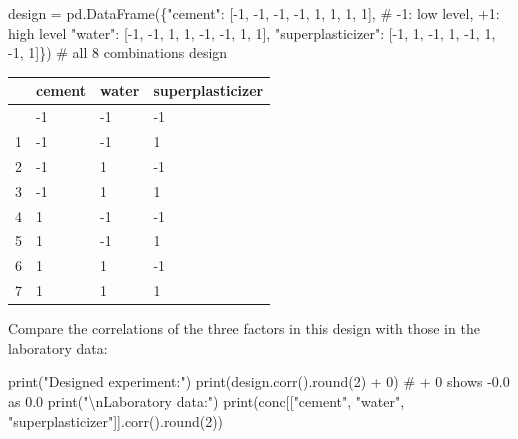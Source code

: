 \documentclass[
  letterpaper,
  DIV=11,
  numbers=noendperiod]{scrreprt}
\newenvironment{Shaded}{\begin{snugshade}}{\end{snugshade}}
\newcommand{\BuiltInTok}[1]{\textcolor[rgb]{0.00,0.23,0.31}{#1}}
\newcommand{\CharTok}[1]{\textcolor[rgb]{0.13,0.47,0.30}{#1}}
\newcommand{\CommentTok}[1]{\textcolor[rgb]{0.37,0.37,0.37}{#1}}
\newcommand{\DecValTok}[1]{\textcolor[rgb]{0.68,0.00,0.00}{#1}}
\newcommand{\NormalTok}[1]{\textcolor[rgb]{0.00,0.23,0.31}{#1}}
\newcommand{\OperatorTok}[1]{\textcolor[rgb]{0.37,0.37,0.37}{#1}}
\newcommand{\StringTok}[1]{\textcolor[rgb]{0.13,0.47,0.30}{#1}}
\begin{document}
\begin{Shaded}
\begin{Highlighting}[]
\NormalTok{design }\OperatorTok{=}\NormalTok{ pd.DataFrame(\{}\StringTok{"cement"}\NormalTok{:           [}\OperatorTok{{-}}\DecValTok{1}\NormalTok{, }\OperatorTok{{-}}\DecValTok{1}\NormalTok{, }\OperatorTok{{-}}\DecValTok{1}\NormalTok{, }\OperatorTok{{-}}\DecValTok{1}\NormalTok{,  }\DecValTok{1}\NormalTok{,  }\DecValTok{1}\NormalTok{,  }\DecValTok{1}\NormalTok{,  }\DecValTok{1}\NormalTok{],  }\CommentTok{\# {-}1: low level, +1: high level}
                       \StringTok{"water"}\NormalTok{:            [}\OperatorTok{{-}}\DecValTok{1}\NormalTok{, }\OperatorTok{{-}}\DecValTok{1}\NormalTok{,  }\DecValTok{1}\NormalTok{,  }\DecValTok{1}\NormalTok{, }\OperatorTok{{-}}\DecValTok{1}\NormalTok{, }\OperatorTok{{-}}\DecValTok{1}\NormalTok{,  }\DecValTok{1}\NormalTok{,  }\DecValTok{1}\NormalTok{],}
                       \StringTok{"superplasticizer"}\NormalTok{: [}\OperatorTok{{-}}\DecValTok{1}\NormalTok{,  }\DecValTok{1}\NormalTok{, }\OperatorTok{{-}}\DecValTok{1}\NormalTok{,  }\DecValTok{1}\NormalTok{, }\OperatorTok{{-}}\DecValTok{1}\NormalTok{,  }\DecValTok{1}\NormalTok{, }\OperatorTok{{-}}\DecValTok{1}\NormalTok{,  }\DecValTok{1}\NormalTok{]\})  }\CommentTok{\# all 8 combinations}
\NormalTok{design}
\end{Highlighting}
\end{Shaded}

\begin{longtable}[]{@{}llll@{}}
\toprule\noalign{}
& cement & water & superplasticizer \\
\midrule\noalign{}
\endhead
\bottomrule\noalign{}
\endlastfoot
0 & -1 & -1 & -1 \\
1 & -1 & -1 & 1 \\
2 & -1 & 1 & -1 \\
3 & -1 & 1 & 1 \\
4 & 1 & -1 & -1 \\
5 & 1 & -1 & 1 \\
6 & 1 & 1 & -1 \\
7 & 1 & 1 & 1 \\
\end{longtable}

Compare the correlations of the three factors in this design with those
in the laboratory data:

\begin{Shaded}
\begin{Highlighting}[]
\BuiltInTok{print}\NormalTok{(}\StringTok{"Designed experiment:"}\NormalTok{)}
\BuiltInTok{print}\NormalTok{(design.corr().}\BuiltInTok{round}\NormalTok{(}\DecValTok{2}\NormalTok{) }\OperatorTok{+} \DecValTok{0}\NormalTok{)                        }\CommentTok{\# + 0 shows {-}0.0 as 0.0}
\BuiltInTok{print}\NormalTok{(}\StringTok{"}\CharTok{\textbackslash{}n}\StringTok{Laboratory data:"}\NormalTok{)}
\BuiltInTok{print}\NormalTok{(conc[[}\StringTok{"cement"}\NormalTok{, }\StringTok{"water"}\NormalTok{, }\StringTok{"superplasticizer"}\NormalTok{]].corr().}\BuiltInTok{round}\NormalTok{(}\DecValTok{2}\NormalTok{))}
\end{Highlighting}
\end{Shaded}
\end{document}
